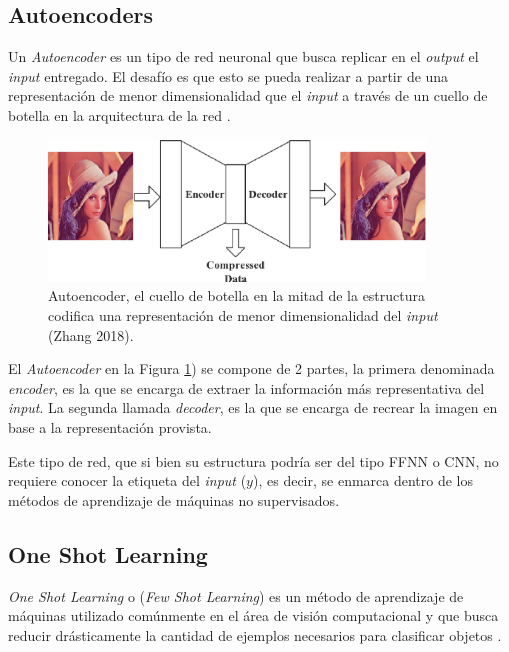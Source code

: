 \subsection{Autoencoders}

Un \textit{Autoencoder} es un tipo de red neuronal que busca replicar en el \textit{output} el \textit{input} entregado. El desafío es que esto se pueda realizar a partir de una representación de menor dimensionalidad que el \textit{input} a través de un cuello de botella en la arquitectura de la red \cite{Zhang2018ABA}.


\begin{figure}[h]
    \centering
    \includegraphics[width=10cm]{img/tesis/autoencoder.png}
    \caption{Autoencoder, el cuello de botella en la mitad de la estructura codifica una representación de menor dimensionalidad del \textit{input} (Zhang 2018).}
    \label{fig:autoencoder}
\end{figure}

El \textit{Autoencoder} en la Figura \ref{fig:autoencoder}) se compone de 2 partes, la primera denominada \textit{encoder}, es la que se encarga de extraer la información más representativa del \textit{input}. La segunda llamada \textit{decoder}, es la que se encarga de recrear la imagen en base a la representación provista. 

\vspace{0.2cm}

Este tipo de red, que si bien su estructura podría ser del tipo FFNN o CNN, no requiere conocer la etiqueta del \textit{input} ($y$), es decir, se enmarca dentro de los métodos de aprendizaje de máquinas no supervisados. 

\subsection{One Shot Learning}

\textit{One Shot Learning} o (\textit{Few Shot Learning}) es un método de aprendizaje de máquinas utilizado comúnmente en el área de visión computacional y que busca reducir drásticamente la cantidad de ejemplos necesarios para clasificar objetos \cite{OMAHONY2019186}.

